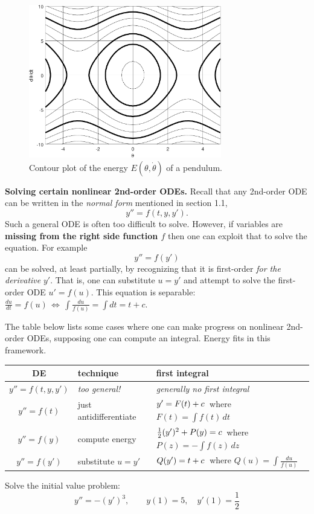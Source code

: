 \documentclass[12pt]{article}
\theoremstyle{definition}
\begin{document}
\begin{figure}[h]
\begin{center}
\includegraphics[width=0.75\textwidth]{figs/pendulumcurves}
\end{center}

\vspace{-5mm}
\caption{Contour plot of the energy $E(\theta,\dot\theta)$ of a pendulum.}
\end{figure}

\medskip
\textbf{Solving certain nonlinear 2nd-order ODEs.}  Recall that any 2nd-order ODE can be written in the \emph{normal form} mentioned in section 1.1,
    $$y'' = f(t,y,y').$$
Such a general ODE is often too difficult to solve.  However, if variables are \textbf{missing from the right side function $f$} then one can exploit that to solve the equation.  For example
    $$y'' = f(y')$$
can be solved, at least partially, by recognizing that it is first-order \emph{for the derivative} $y'$.  That is, one can substitute $u=y'$ and attempt to solve the first-order ODE $u'=f(u)$.  This equation is separable: \, $\frac{du}{dt} = f(u) \, \iff \, \int \frac{du}{f(u)} = \int dt = t + c$.

The table below lists some cases where one can make progress on nonlinear 2nd-order ODEs, supposing one can compute an integral.  Energy fits in this framework.

\medskip
\begin{tabular}{c|l|l}
DE & technique & first integral \\ \hline \hline
$y'' = f(t,y,y')$ & \emph{too general!} & \emph{generally no first integral} \\ \hline
$y'' = f(t)$ & just antidifferentiate & $y' = F(t)+c \large\strut$\, where $F(t) = \int f(t)\,dt$ \\ \hline
$y'' = f(y)$ & compute energy & $\frac{1}{2} (y')^2 + P(y) = c \large\strut$\, where $P(z) = -\int f(z)\,dz$ \\ \hline
$y'' = f(y')$ & substitute $u=y'$ & $Q(y') = t + c \large\strut$\, where $Q(u)=\int \frac{du}{f(u)}$
\end{tabular}

\medskip
\begin{prob}
Solve the initial value problem:
    $$y'' = - (y')^3, \qquad y(1)=5, \quad y'(1)=\frac{1}{2}$$
\end{prob}
\end{document}
